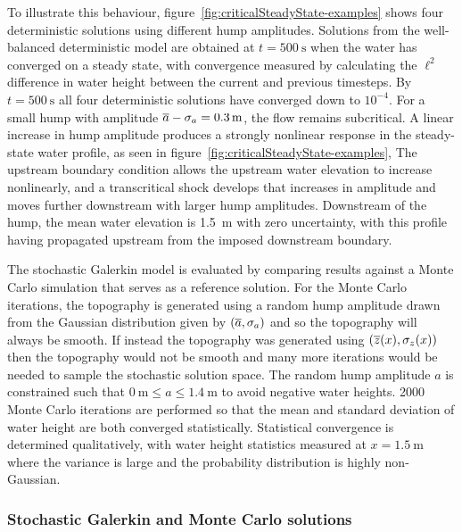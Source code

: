 To illustrate this behaviour, figure~\ref{fig:criticalSteadyState-examples} shows four deterministic solutions using different hump amplitudes.
Solutions from the well-balanced deterministic model are obtained at $t = \SI{500}{\second}$ when the water has converged on a steady state, with convergence measured by calculating the $\ell^2$ difference in water height between the current and previous timesteps.
By $t = \SI{500}{\second}$ all four deterministic solutions have converged down to $10^{-4}$.
For a small hump with amplitude $\overline{a} - \sigma_a = \SI{0.3}{\meter}$, the flow remains subcritical.
A linear increase in hump amplitude produces a strongly nonlinear response in the steady-state water profile, as seen in figure~\ref{fig:criticalSteadyState-examples}, 
The upstream boundary condition allows the upstream water elevation to increase nonlinearly, and a transcritical shock develops that increases in amplitude and moves further downstream with larger hump amplitudes.
Downstream of the hump, the mean water elevation is \SI{1.5}{\meter} with zero uncertainty, with this profile having propagated upstream from the imposed downstream boundary.

The stochastic Galerkin model is evaluated by comparing results against a Monte Carlo simulation that serves as a reference solution.
For the Monte Carlo iterations, the topography is generated using a random hump amplitude drawn from the Gaussian distribution given by $(\overline{a}, \sigma_a)$ and so the topography will always be smooth.
If instead the topography was generated using $(\overline{z}(x), \sigma_z(x))$ then the topography would not be smooth and many more iterations would be needed to sample the stochastic solution space.
The random hump amplitude $a$ is constrained such that $\SI{0}{\meter} \leq a \leq \SI{1.4}{\meter}$ to avoid negative water heights.
2000 Monte Carlo iterations are performed so that the mean and standard deviation of water height are both converged statistically.
Statistical convergence is determined qualitatively, with water height statistics measured at $x = \SI{1.5}{\meter}$ where the variance is large and the probability distribution is highly non-Gaussian.

\subsubsection{Stochastic Galerkin and Monte Carlo solutions}

